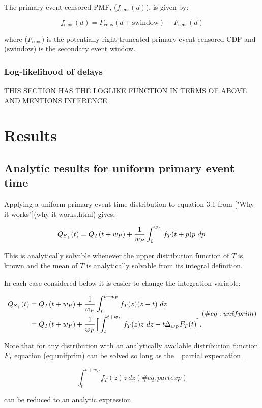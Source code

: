 \documentclass[10pt,letterpaper]{article}
\begin{document}
The primary event censored PMF, ($f_{\text{cens}}(d)$), is given by:

$$
f_{\text{cens}}(d) = F_{\text{cens}}(d + \text{swindow}) - F_{\text{cens}}(d)
$$

where ($F_{\text{cens}}$) is the potentially right truncated primary event censored CDF and ($\text{swindow}$) is the secondary event window.

\subsubsection{Log-likelihood of delays}
THIS SECTION HAS THE LOGLIKE FUNCTION IN TERMS OF ABOVE AND MENTIONS INFERENCE

\section*{Results}

\subsection{Analytic results for uniform primary event time}

Applying a uniform primary event time distribution to equation 3.1 from ["Why it works"](why-it-works.html) gives:

$$
Q_{S_+}(t) = Q_T(t + w_P) + { 1 \over w_P} \int_0^{w_P} f_T(t+p) p~ dp.
$$

This is analytically solvable whenever the upper distribution function of $T$ is known and the mean of $T$ is analytically solvable from its integral definition.

In each case considered below it is easier to change the integration variable:

$$
\begin{aligned}
Q_{S_+}(t) &= Q_T(t + w_P) + { 1 \over w_P} \int_t^{t+w_P} f_T(z) (z-t)~ dz \\
&= Q_T(t + w_P) + { 1 \over w_P} \Big[  \int_t^{t+w_P} f_T(z) z~ dz - t \Delta_{w_P}F_T(t) \Big].
\end{aligned} (\#eq:unifprim)
$$

Note that for any distribution with an analytically available distribution function $F_T$ equation \@ref(eq:unifprim) can be solved so long as the _partial expectation_

$$
\int_t^{t+w_P} f_T(z) z~ dz (\#eq:partexp)
$$

can be reduced to an analytic expression.
\end{document}
